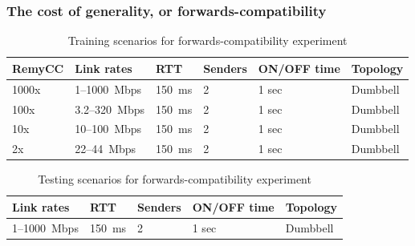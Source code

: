 \begin{frame}
\frametitle{The cost of generality, or forwards-compatibility}
\begin{table}
\begin{center}
\begin{scriptsize}
\begin{tabular}{l|l|l|l|l|l}
\bf RemyCC & \bf Link rates & \bf RTT & \bf Senders & ON/OFF time & Topology \\
\hline
1000x  & 1--1000~Mbps & 150~ms & 2  & 1 sec & Dumbbell\\
100x   & 3.2--320~Mbps & 150~ms & 2 & 1 sec & Dumbbell\\
10x    & 10--100~Mbps & 150~ms & 2 & 1 sec & Dumbbell \\
2x     & 22--44~Mbps & 150~ms & 2 & 1 sec & Dumbbell \\
\end{tabular}
\end{scriptsize}
\caption{Training scenarios for forwards-compatibility experiment}
\label{table:oprange}
\end{center}
\end{table}

\begin{table}
\begin{center}
\begin{scriptsize}
\begin{tabular}{l|l|l|l|l}
\bf Link rates & \bf RTT & \bf Senders & ON/OFF time & Topology \\
\hline
1--1000~Mbps & 150~ms & 2  & 1 sec & Dumbbell\\
\end{tabular}
\end{scriptsize}
\caption{Testing scenarios for forwards-compatibility experiment}
\label{table:oprange}
\end{center}
\end{table}

\end{frame}

